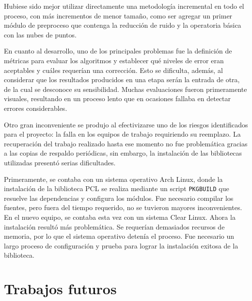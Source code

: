 Hubiese sido mejor utilizar directamente una metodología incremental en todo el
proceso, con más incrementos de menor tamaño, como ser agregar un primer módulo
de preproceso que contenga la reducción de ruido y la operatoria básica con las
nubes de puntos.

En cuanto al desarrollo, uno de los principales problemas fue la definición de
métricas para evaluar los algoritmos y establecer qué niveles de error eran
aceptables y cuáles requerían una corrección.
Esto se dificulta, además, al considerar que los resultados producidos en una etapa
serán la entrada de otra, de la cual se desconoce su sensibilidad.
Muchas evaluaciones fueron primeramente visuales, resultando en un proceso lento
que en ocasiones fallaba en detectar errores considerables.

Otro gran inconveniente se produjo al efectivizarse uno de los riesgos
identifi\-cados para el proyecto: la falla en los equipos de trabajo
requiriendo su reemplazo.
La recuperación del trabajo realizado hasta ese momento no fue problemática
gracias a las copias de respaldo periódicas, sin embargo, la instalación de las bibliotecas
utilizadas presentó serias dificultades.

Primeramente, se contaba con un sistema operativo Arch Linux, donde la
instalación de la biblioteca PCL se realiza mediante un script
\texttt{PKGBUILD} que resuelve las dependencias y configura los módulos.  Fue
necesario compilar los fuentes, pero fuera del tiempo requerido, no se tuvieron
mayores inconvenientes.  En el nuevo equipo, se contaba esta vez con un sistema
Clear Linux.  Ahora la instalación resultó más problemática.  Se requerían
demasiados recursos de memoria, por lo que el sistema operativo detenía el
proceso.  Fue necesario un largo proceso de configuración y prueba para lograr
la instalación exitosa de la biblioteca.

%



\section{Trabajos futuros}

